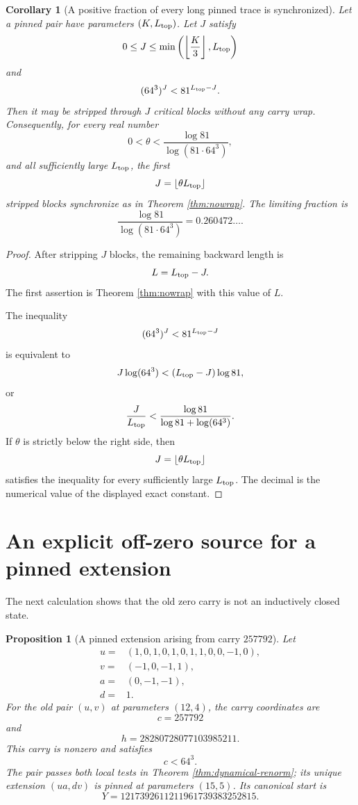 \documentclass[11pt]{article}
\newtheorem{proposition}[theorem]{Proposition}
\newtheorem{corollary}[theorem]{Corollary}
\theoremstyle{remark}
\begin{document}
\begin{corollary}[A positive fraction of every long pinned trace is synchronized]
\label{cor:fraction}
Let a pinned pair have parameters $(K,L_{\rm top})$.  Let $J$ satisfy
\[
0\le J\le\min\left(\left\lfloor\frac K3\right\rfloor,L_{\rm top}\right)
\]
and
\[
(64^3)^J<81^{L_{\rm top}-J}.
\]
Then it may be stripped through $J$ critical blocks without any carry wrap.  Consequently, for every real number
\[
0<\theta<\frac{\log81}{\log(81\cdot64^3)},
\]
and all sufficiently large $L_{\rm top}$, the first
\[
J=\lfloor\theta L_{\rm top}\rfloor
\]
stripped blocks synchronize as in Theorem \ref{thm:nowrap}.  The limiting fraction is
\[
\frac{\log81}{\log(81\cdot64^3)}=0.260472\ldots.
\]
\end{corollary}

\begin{proof}
After stripping $J$ blocks, the remaining backward length is
\[
L=L_{\rm top}-J.
\]
The first assertion is Theorem \ref{thm:nowrap} with this value of $L$.

The inequality
\[
(64^3)^J<81^{L_{\rm top}-J}
\]
is equivalent to
\[
J\log(64^3)<(L_{\rm top}-J)\log81,
\]
or
\[
\frac{J}{L_{\rm top}}
<
\frac{\log81}{\log81+\log(64^3)}.
\]
If $\theta$ is strictly below the right side, then
\[
J=\lfloor\theta L_{\rm top}\rfloor
\]
satisfies the inequality for every sufficiently large $L_{\rm top}$.  The decimal is the numerical value of the displayed exact constant.
\end{proof}

\section{An explicit off-zero source for a pinned extension}

The next calculation shows that the old zero carry is not an inductively closed state.

\begin{proposition}[A pinned extension arising from carry $257792$]
\label{prop:offzero}
Let
\[
\begin{aligned}
u={}&(1,0,1,0,1,0,1,1,0,0,-1,0),\\
v={}&(-1,0,-1,1),\\
a={}&(0,-1,-1),\\
d={}&1.
\end{aligned}
\]
For the old pair $(u,v)$ at parameters $(12,4)$, the carry coordinates are
\[
c=257792
\]
and
\[
h=28280728077103985211.
\]
This carry is nonzero and satisfies
\[
c<64^3.
\]
The pair passes both local tests in Theorem \ref{thm:dynamical-renorm}; its unique extension $(ua,dv)$ is pinned at parameters $(15,5)$.  Its canonical start is
\[
Y=1217392611211961739383252815.
\]
\end{proposition}
\end{document}
